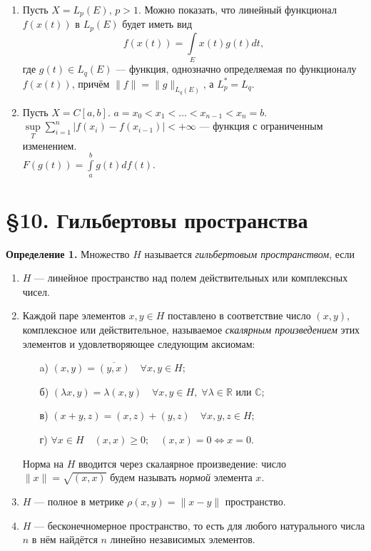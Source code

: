 \documentclass[12pt,a4paper, titlepage]{article}
\begin{document}
\begin{enumerate}
\item
Пусть $X = L_p(E)$, $p > 1$. Можно показать, что линейный функционал $f(x(t))$ в $L_p(E)$ будет иметь вид
$$
f(x(t)) = \int\limits_E x(t) g(t) dt,
$$
где $g(t) \in L_q(E)$ --- функция, однозначно определяемая по функционалу $f(x(t))$, причём $\|f\| = \|g\|_{L_q(E)}$, а $L_p^* = L_q$.

\item
Пусть $X = C[a, b]$. $a = x_0 < x_1 < \dots < x_{n-1} < x_n = b$.\\
$\sup\limits_{T}\sum\limits_{i=1}^{n}|f(x_i) - f(x_{i - 1})| < +\infty$ --- функция с ограниченным изменением.\\
$F(g(t)) = \int\limits_a^bg(t)df(t)$.

\end{enumerate}










\section*{ \S 10. Гильбертовы пространства}

\textbf{Определение 1.} Множество $H$ называется \textit{гильбертовым пространством}, если
\begin{enumerate}
\item
$H$ --- линейное пространство над полем действительных или комплексных чисел.
\item
Каждой паре элементов $x, y \in H$ поставлено в соответствие число $(x, y)$, комплексное или действительное, называемое \textit{скалярным произведением} этих элементов и удовлетворяющее следующим аксиомам:
	\begin{itemize}
	\item[a)]
	$(x,y) = \overline{(y,x)} \quad \forall x, y \in H;$
	\item[б)]
	$(\lambda x,y) = \lambda (x,y) \quad \forall x, y \in H, \; \forall \lambda \in \mathbb{R} \text{ или } \mathbb{C};$
	\item[в)]
	$(x + y, z) = (x, z) + (y, z) \quad \forall x, y, z \in H;$
	\item[г)]
	$\forall x \in H \quad (x, x) \geqslant 0; \quad (x, x) = 0 \Leftrightarrow x = 0$.
	\end{itemize}
Норма на $H$ вводится через скалаярное произведение: число $\|x\| = \sqrt{(x, x)}$ будем называть \textit{нормой} элемента $x$.
\item
$H$ --- полное в метрике $\rho (x, y) = \|x - y\|$ пространство.
\item
$H$ --- бесконечномерное пространство, то есть для любого натурального числа $n$ в нём найдётся $n$ линейно независимых элементов.
\end{enumerate}
\end{document}
